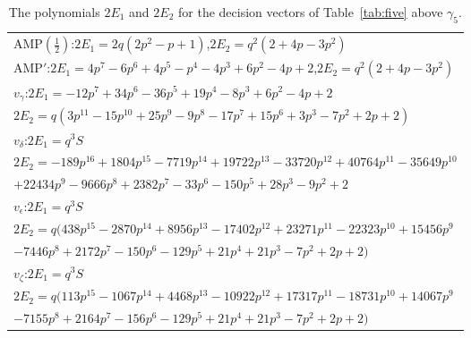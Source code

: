 \documentclass[11pt]{article}
\newcommand{\h}{\tfrac12}
\begin{document}
\begin{table}[ht]
\centering
\small
\begin{tabular}{l}
\toprule
$\mathrm{AMP}(\h)$:\quad $2E_1=2q(2p^2-p+1)$,\quad $2E_2=q^2(2+4p-3p^2)$\\
$\mathrm{AMP}'$:\quad $2E_1=4p^7-6p^6+4p^5-p^4-4p^3+6p^2-4p+2$,\quad $2E_2=q^2(2+4p-3p^2)$\\
\midrule
$v_\gamma$:\quad $2E_1=-12p^7+34p^6-36p^5+19p^4-8p^3+6p^2-4p+2$\\
\qquad $2E_2=q(3p^{11}-15p^{10}+25p^9-9p^8-17p^7+15p^6+3p^3-7p^2+2p+2)$\\
\midrule
$v_\delta$:\quad $2E_1=q^3S$\\
\qquad $2E_2=-189p^{16}+1804p^{15}-7719p^{14}+19722p^{13}-33720p^{12}+40764p^{11}-35649p^{10}$\\
\qquad\qquad $+22434p^9-9666p^8+2382p^7-33p^6-150p^5+28p^3-9p^2+2$\\
\midrule
$v_\epsilon$:\quad $2E_1=q^3S$\\
\qquad $2E_2=q(438p^{15}-2870p^{14}+8956p^{13}-17402p^{12}+23271p^{11}-22323p^{10}+15456p^9$\\
\qquad\qquad $-7446p^8+2172p^7-150p^6-129p^5+21p^4+21p^3-7p^2+2p+2)$\\
\midrule
$v_\zeta$:\quad $2E_1=q^3S$\\
\qquad $2E_2=q(113p^{15}-1067p^{14}+4468p^{13}-10922p^{12}+17317p^{11}-18731p^{10}+14067p^9$\\
\qquad\qquad $-7155p^8+2164p^7-156p^6-129p^5+21p^4+21p^3-7p^2+2p+2)$\\
\bottomrule
\end{tabular}
\caption{The polynomials $2E_1$ and $2E_2$ for the decision vectors of Table~\ref{tab:five} above $\gamma_5$.}\label{tab:poly5}
\end{table}
\end{document}
